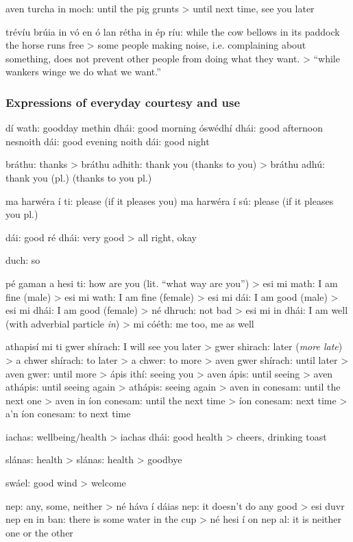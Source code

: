 aven turcha in moch: until the pig grunts
> until next time, see you later

tr\'{e}v\'{i}u br\'{u}ia in v\'{o} en \'{o} lan r\'{e}tha in \'{e}p r\'{i}u: while the cow bellows in its paddock the horse runs free
> some people making noise, i.e. complaining about something, does not prevent other people from doing what they want. > ``while wankers winge we do what we want.''

\subsubsection{Expressions of everyday courtesy and use}

d\'{i} wath: goodday
methin dh\'{a}i: good morning
\'{o}sw\'{e}dh\'{i} dh\'{a}i: good afternoon
nesnoith d\'{a}i: good evening
noith d\'{a}i: good night

br\'{a}thu: thanks
> br\'{a}thu adhith: thank you (thanks to you)
> br\'{a}thu adh\'{u}: thank you (pl.) (thanks to you pl.)

ma harw\'{e}ra \'{i} ti: please (if it pleases you)
ma harw\'{e}ra \'{i} s\'{u}: please (if it pleases you pl.)

d\'{a}i: good
r\'{e} dh\'{a}i: very good
> all right, okay

duch: so

p\'{e} gaman a hesi ti: how are you (lit. ``what way are you'')
> esi mi math: I am fine (male)
> esi mi wath: I am fine (female)
> esi mi d\'{a}i: I am good (male)
> esi mi dh\'{a}i: I am good (female)
> n\'{e} dhruch: not bad
> esi mi in dh\'{a}i: I am well (with adverbial particle \textit{in})
> mi c\'{o}\'{e}th: me too, me as well

athapis\'{i} mi ti gwer sh\'{i}rach: I will see you later
> gwer shirach: later (\textit{more late})
> a chwer sh\'{i}rach: to later
> a chwer: to more
> aven gwer sh\'{i}rach: until later
> aven gwer: until more
> \'{a}pis ith\'{i}: seeing you
> aven \'{a}pis: until seeing
> aven ath\'{a}pis: until seeing again
> ath\'{a}pis: seeing again
> aven in conesam: until the next one
> aven in \'{i}on conesam: until the next time
> \'{i}on conesam: next time
> a'n \'{i}on conesam: to next time

iachas: wellbeing/health
> iachas dh\'{a}i: good health > cheers, drinking toast

sl\'{a}nas: health
> sl\'{a}nas: health > goodbye

sw\'{a}el: good wind > welcome

nep: any, some, neither
> n\'{e} h\'{a}va \'{i} d\'{a}ias nep: it doesn't do any good
> esi duvr nep en in ban: there is some water in the cup
> n\'{e} hesi \'{i} on nep al: it is neither one or the other

